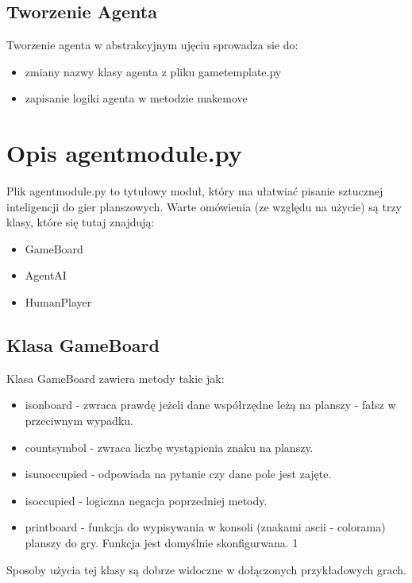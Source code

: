 \documentclass[polish,shortabstract,inz]{iithesis}
\begin{document}
\subsection{Tworzenie Agenta}
Tworzenie agenta w abstrakcyjnym ujęciu sprowadza sie do:
\begin{itemize}
  \item zmiany nazwy klasy agenta z pliku game\textunderscore template.py
  \item zapisanie logiki agenta w metodzie make\textunderscore move
\end{itemize}

\section{Opis agent\textunderscore module.py}
Plik agent\textunderscore module.py to tytułowy moduł, który ma ułatwiać pisanie sztucznej inteligencji do gier planszowych.
Warte omówienia (ze względu na użycie) są trzy klasy, które się tutaj znajdują:
\begin{itemize}
  \item GameBoard
  \item AgentAI
  \item HumanPlayer
\end{itemize}

\subsection{Klasa GameBoard}
Klasa GameBoard zawiera metody takie jak:
\begin{itemize}
  \item is\textunderscore on\textunderscore board - zwraca prawdę jeżeli dane współrzędne leżą na planszy - fałsz w przeciwnym wypadku.
  \item count\textunderscore symbol - zwraca liczbę wystąpienia znaku na planszy.
  \item is\textunderscore unoccupied - odpowiada na pytanie czy dane pole jest zajęte.
  \item is\textunderscore occupied - logiczna negacja poprzedniej metody.
  \item print\textunderscore board - funkcja do wypisywania w konsoli (znakami ascii - colorama) planszy do gry.
  Funkcja jest domyślnie skonfigurwana. 1
\end{itemize}
Sposoby użycia tej klasy są dobrze widoczne w dołączonych przykładowych grach.
\end{document}
